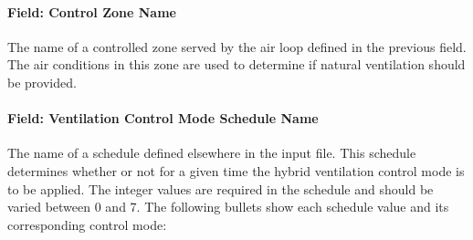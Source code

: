 \paragraph{Field: Control Zone Name}\label{field-controlled-zone-name}

The name of a controlled zone served by the air loop defined in the previous field. The air conditions in this zone are used to determine if natural ventilation should be provided.

\paragraph{Field: Ventilation Control Mode Schedule Name}\label{field-ventilation-control-mode-schedule-name}

The name of a schedule defined elsewhere in the input file. This schedule determines whether or not for a given time the hybrid ventilation control mode is to be applied. The integer values are required in the schedule and should be varied between 0 and 7. The following bullets show each schedule value and its corresponding control mode:

